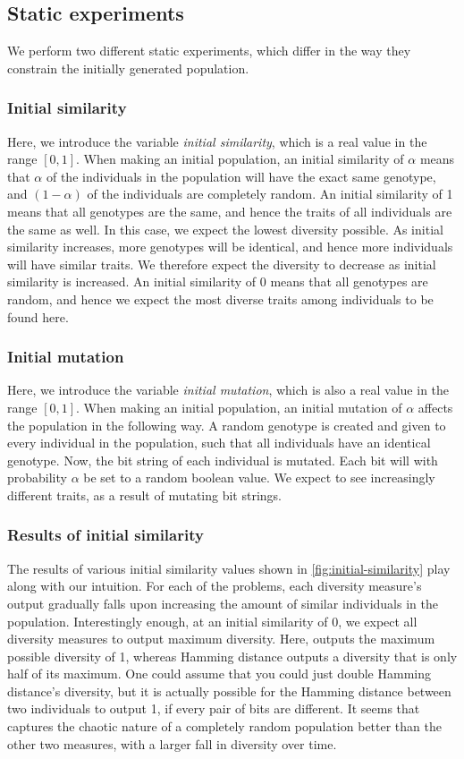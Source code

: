 \subsection{Static experiments}
We perform two different static experiments, which differ in the way they constrain the initially generated population. 

\subsubsection{Initial similarity}
Here, we introduce the variable \emph{initial similarity}, which is a real value in the range $[0,1]$.
When making an initial population, an initial similarity of $\alpha$ means that $\alpha$ of the individuals in the population will have the exact same genotype, and $(1 - \alpha)$ of the individuals are completely random.
An initial similarity of \num{1} means that all genotypes are the same, and hence the traits of all individuals are the same as well. In this case, we expect the lowest diversity possible.
As initial similarity increases, more genotypes will be identical, and hence more individuals will have similar traits.
We therefore expect the diversity to decrease as initial similarity is increased.
An initial similarity of \num{0} means that all genotypes are random, and hence we expect the most diverse traits among individuals to be found here.

\subsubsection{Initial mutation}
Here, we introduce the variable \emph{initial mutation}, which is also a real value in the range $[0,1]$.
When making an initial population, an initial mutation of $\alpha$ affects the population in the following way.
A random genotype is created and given to every individual in the population, such that all individuals have an identical genotype.
Now, the bit string of each individual is mutated. Each bit will with probability $\alpha$ be set to a random boolean value. 
We expect to see increasingly different traits, as a result of mutating bit strings. 

\subsubsection{Results of initial similarity} The results of various initial similarity values shown in \cref{fig:initial-similarity} play along with our intuition. For each of the problems, each diversity measure's output gradually falls upon increasing the amount of similar individuals in the population. Interestingly enough, at an initial similarity of 0, we expect all diversity measures to output maximum diversity. Here, \dia{} outputs the maximum possible diversity of 1, whereas Hamming distance outputs a diversity that is only half of its maximum. One could assume that you could just double Hamming distance's diversity, but it is actually possible for the Hamming distance between two individuals to output 1, if every pair of bits are different. It seems that \dia{} captures the chaotic nature of a completely random population better than the other two measures, with a larger fall in diversity over time.
%

%

